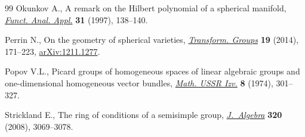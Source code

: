 \documentclass[10pt,a4paper]{amsart}
\numberwithin{equation}{section}
\theoremstyle{definition}
\begin{document}
\begin{thebibliography}{99}
Okunkov A., A remark on the {H}ilbert polynomial of a spherical manifold,
 \href{https://doi.org/10.1007/BF02466023}{\textit{Funct. Anal. Appl.}} \textbf{31} (1997), 138--140.

Perrin N., On the geometry of spherical varieties, \href{https://doi.org/10.1007/s00031-014-9254-0}{\textit{Transform. Groups}}
 \textbf{19} (2014), 171--223, \href{https://arxiv.org/abs/1211.1277}{arXiv:1211.1277}.

Popov V.L., Picard groups of homogeneous spaces of linear algebraic groups and
 one-dimensional homogeneous vector bundles, \href{https://doi.org/10.1070/IM1974v008n02ABEH002107}{\textit{Math. USSR Izv.}}
 \textbf{8} (1974), 301--327.

Strickland E., The ring of conditions of a semisimple group,
 \href{https://doi.org/10.1016/j.jalgebra.2008.07.003}{\textit{J.~Algebra}} \textbf{320} (2008), 3069--3078.

\end{thebibliography}
\end{document}
